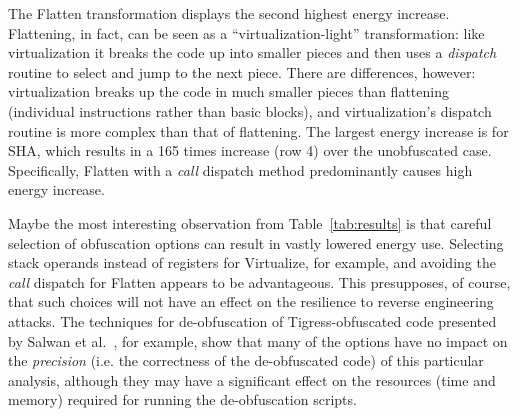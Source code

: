 The Flatten transformation displays the second highest energy increase. Flattening, in fact, can be seen as a ``virtualization-light'' transformation: like virtualization it breaks the code up into smaller pieces and then uses a {\em dispatch} routine to select and jump to the next piece. There are differences, however: virtualization breaks up the code in much smaller pieces than flattening (individual instructions rather than basic blocks), and virtualization's dispatch routine is more complex than that of flattening. The largest energy increase is for SHA, which results in a 165 times increase (row 4) over the unobfuscated case. Specifically, Flatten with a {\em call} dispatch method predominantly causes high energy increase. 


Maybe the most interesting observation from Table~\ref{tab:results} is that careful selection of obfuscation options can result in vastly lowered energy use. Selecting stack operands instead of registers for Virtualize, for example, and avoiding the {\em call} dispatch for Flatten appears to be advantageous. This presupposes, of course, that such choices will not have an effect on the resilience to reverse engineering attacks. The techniques for de-obfuscation of  Tigress-obfuscated code presented by Salwan et al.~\cite{salwan2018symbolic}, for example, show that many of the options have no impact on the {\em precision} (i.e. the correctness of the de-obfuscated code) of this particular analysis, although they may have a significant effect on the resources (time and memory) required for running the de-obfuscation scripts.

\endinput






